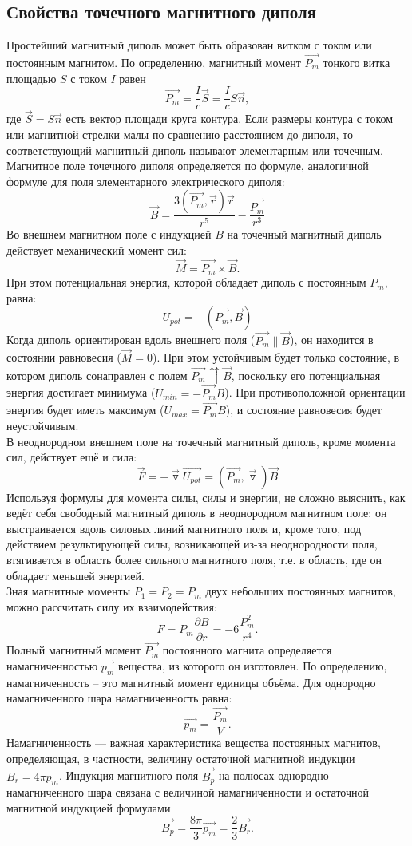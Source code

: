 \documentclass[a4paper,12pt]{article}
\begin{document}
\subsection*{Свойства точечного магнитного диполя}
Простейший магнитный диполь может быть образован витком с током или постоянным магнитом. По определению, магнитный момент $\overrightarrow{P_m}$ тонкого витка площадью $S$ с током $I$ равен
$$
\overrightarrow{P_m}=\dfrac{I}{c}\vec{S}=\dfrac{I}{c}S\vec{n},
$$
где $\vec{S}=S\vec{n}$ есть вектор площади круга контура. Если размеры контура с током или магнитной стрелки малы по сравнению расстоянием до диполя, то соответствующий магнитный диполь называют элементарным или точечным.\\
Магнитное поле точечного диполя определяется по формуле, аналогичной формуле для поля элементарного электрического диполя:
$$
\vec{B}=\dfrac{3(\overrightarrow{P_m},\vec{r})\vec{r}}{r^5} - \dfrac{\overrightarrow{P_m}}{r^3}
$$ 
Во внешнем магнитном поле с индукцией $B$ на точечный магнитный диполь  действует механический момент сил:
$$
\vec{M} = \overrightarrow{P_m}\times \vec{B}.
$$
При этом потенциальная энергия, которой обладает диполь с постоянным $P_m$, равна:
$$
U_{pot} = -(\overrightarrow{P_m},\vec{B})
$$
Когда диполь ориентирован вдоль внешнего поля ($\vec{P_m}\parallel \vec{B}$), он находится в состоянии равновесия ($\vec{M} = 0$). При этом устойчивым будет только состояние, в котором диполь сонаправлен с полем $\vec{P_m}\upuparrows\vec{B}$, поскольку его потенциальная энергия достигает минимума ($U_{min} = -\vec{P_m}B$). При противоположной ориентации энергия будет иметь максимум ($U_{max} = \vec{P_m}B$), и состояние равновесия будет неустойчивым.
\\
В неоднородном внешнем поле на точечный магнитный диполь, кроме момента сил, действует ещё и сила:
$$
\vec{F}= -\vec{\triangledown}\vec{U_{pot}} = (\overrightarrow{P_m},\vec{\triangledown})\vec{B}
$$
Используя формулы для момента силы, силы и энергии, не сложно выяснить, как ведёт себя свободный магнитный диполь в неоднородном магнитном поле: он выстраивается вдоль силовых линий магнитного поля и, кроме того, под действием результирующей силы, возникающей из-за неоднородности поля, втягивается в область более сильного магнитного поля, т.е. в область, где он обладает меньшей энергией.\\
Зная магнитные моменты $P_1 = P_2 = P_m$ двух небольших постоянных магнитов, можно рассчитать силу
их взаимодействия:
$$
F = P_m \dfrac{\partial B}{\partial r}=-6\dfrac{P_m^2}{r^4}.
$$
Полный магнитный момент $\overrightarrow{P_m}$
постоянного магнита определяется намагниченностью $\overrightarrow{p_m}$
вещества, из которого он изготовлен. По определению, намагниченность – это магнитный момент единицы объёма. Для однородно намагниченного шара намагниченность равна:
$$
\overrightarrow{p_m}=\dfrac{\overrightarrow{P_m}}{V}.
$$
Намагниченность — важная характеристика вещества постоянных магнитов, определяющая, в
частности, величину остаточной магнитной индукции $B_r = 4\pi p_m$. Индукция магнитного поля $\overrightarrow{B_p}$
на полюсах однородно намагниченного шара связана с величиной намагниченности и остаточной магнитной индукцией формулами
$$
\overrightarrow{B_p}=\dfrac{8\pi}{3}\overrightarrow{p_m}=\dfrac{2}{3}\overrightarrow{B_r}.
$$
\end{document}
